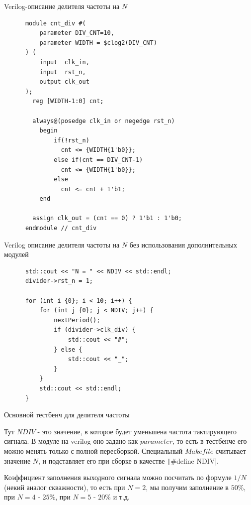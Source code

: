\documentclass[a4paper]{article}
\begin{document}
  \begin{listing}[H]
    \inputminted{verilog}{../chapter_6/freq_div/divider.v}
    \caption{Verilog-описание делителя частоты на $N$}
  \end{listing}

  \begin{listing}[H]
    \begin{verbatim}
      module cnt_div #(
          parameter DIV_CNT=10,
          parameter WIDTH = $clog2(DIV_CNT)
      ) (
          input  clk_in,
          input  rst_n,
          output clk_out
      );
        reg [WIDTH-1:0] cnt;

        always@(posedge clk_in or negedge rst_n)
          begin
              if(!rst_n)
                cnt <= {WIDTH{1'b0}};
              else if(cnt == DIV_CNT-1)
                cnt <= {WIDTH{1'b0}};
              else
                cnt <= cnt + 1'b1;
          end
        
        assign clk_out = (cnt == 0) ? 1'b1 : 1'b0;        
      endmodule // cnt_div
    \end{verbatim}
    \caption{Verilog описание делителя частоты на $N$ без использования дополнительных модулей}
  \end{listing}

  \begin{listing}[H]
    \begin{verbatim}
      std::cout << "N = " << NDIV << std::endl;
      divider->rst_n = 1;

      for (int i {0}; i < 10; i++) {
          for (int j {0}; j < NDIV; j++) {
              nextPeriod();
              if (divider->clk_div) {
                  std::cout << "#";
              } else {
                  std::cout << "_";
              }
          }
          std::cout << std::endl;
      }
    \end{verbatim}
    \caption{Основной тестбенч для делителя частоты}
  \end{listing}

  Тут $NDIV$ - это значение, в которое будет уменьшена частота тактирующего сигнала. В
  модуле на verilog оно задано как $parameter$, то есть в тестбенче его можно менять только
  с полной пересборкой. Специальный $Makefile$ считывает значение $N$, и подставляет его при
  сборке в качестве \texttt|#define NDIV|.

  Коэффициент заполнения выходного сигнала можно посчитать по формуле $1 / N$ (некий аналог скважности),
  то есть при $N = 2$, мы получим заполнение в $50\%$, при $N = 4$ - $25\%$, при $N = 5$ - $20\%$ и т.д.
\end{document}
